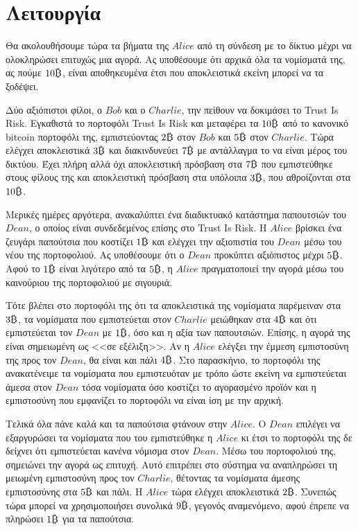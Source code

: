 \section{Λειτουργία}
  Θα ακολουθήσουμε τώρα τα βήματα της $Alice$ από τη σύνδεση με το δίκτυο μέχρι να ολοκληρώσει επιτυχώς μια αγορά. Ας
  υποθέσουμε ότι αρχικά όλα τα νομίσματά της, ας πούμε $10\bitcoin$, είναι αποθηκευμένα έτσι που αποκλειστικά εκείνη μπορεί να
  τα ξοδέψει.

  Δύο αξιόπιστοι φίλοι, ο $Bob$ και ο $Charlie$, την πείθουν να δοκιμάσει το \textlatin{Trust Is Risk}. Εγκαθιστά το πορτοφόλι
  \textlatin{Trust Is Risk} και μεταφέρει τα $10\bitcoin$ από το κανονικό \textlatin{bitcoin} πορτοφόλι της, εμπιστεύοντας
  $2\bitcoin$ στον $Bob$ και $5\bitcoin$ στον $Charlie$. Τώρα ελέγχει αποκλειστικά $3\bitcoin$ και διακινδυνεύει $7\bitcoin$
  με αντάλλαγμα το να είναι μέρος του δικτύου. Έχει πλήρη αλλά όχι αποκλειστική πρόσβαση στα $7\bitcoin$ που εμπιστεύθηκε
  στους φίλους της και αποκλειστική πρόσβαση στα υπόλοιπα $3\bitcoin$, που αθροίζονται στα $10\bitcoin$.

  Μερικές ημέρες αργότερα, ανακαλύπτει ένα διαδικτυακό κατάστημα παπουτσιών του $Dean$, ο οποίος είναι συνδεδεμένος επίσης στο
  \textlatin{Trust Is Risk}. Η $Alice$ βρίσκει ένα ζευγάρι παπούτσια που κοστίζει $1\bitcoin$ και ελέγχει την αξιοπιστία του
  $Dean$ μέσω του νέου της πορτοφολιού. Ας υποθέσουμε ότι ο $Dean$ προκύπτει αξιόπιστος μέχρι $5\bitcoin$. Αφού το $1\bitcoin$
  είναι λιγότερο από τα $5\bitcoin$, η $Alice$ πραγματοποιεί την αγορά μέσω του καινούριου της πορτοφολιού με σιγουριά.

  Τότε βλέπει στο πορτοφόλι της ότι τα αποκλειστικά της νομίσματα παρέμειναν στα $3\bitcoin$, τα νομίσματα που εμπιστεύεται
  στον $Charlie$ μειώθηκαν στα $4\bitcoin$ και ότι εμπιστεύεται τον $Dean$ με $1\bitcoin$, όσο και η αξία των παπουτσιών.
  Επίσης, η αγορά της είναι σημειωμένη ως <<σε εξέλιξη>>. Αν η $Alice$ ελέγξει την έμμεση εμπιστοσύνη της προς τον $Dean$, θα
  είναι και πάλι $4\bitcoin$. Στο παρασκήνιο, το πορτοφόλι της ανακατένειμε τα νομίσματα που εμπιστευόταν με τρόπο ώστε εκείνη
  να εμπιστεύεται άμεσα στον $Dean$ τόσα νομίσματα όσο κοστίζει το αγορασμένο προϊόν και η εμπιστοσύνη που εμφανίζει το
  πορτοφόλι να είναι ίση με την αρχική.

  Τελικά όλα πάνε καλά και τα παπούτσια φτάνουν στην $Alice$. Ο $Dean$ επιλέγει να εξαργυρώσει τα νομίσματα που του
  εμπιστεύθηκε η $Alice$ κι έτσι το πορτοφόλι της δε δείχνει ότι εμπιστεύεται κανένα νόμισμα στον $Dean$. Μέσω του πορτοφολιού
  της, σημειώνει την αγορά ως επιτυχή. Αυτό επιτρέπει στο σύστημα να αναπληρώσει τη μειωμένη εμπιστοσύνη προς τον $Charlie$,
  θέτοντας τα νομίσματα άμεσης εμπιστοσύνης στα $5\bitcoin$ και πάλι. Η $Alice$ τώρα ελέγχει αποκλειστικά $2\bitcoin$. Συνεπώς
  τώρα μπορεί να χρησιμοποιήσει συνολικά $9\bitcoin$, γεγονός αναμενόμενο, αφού έπρεπε να πληρώσει $1\bitcoin$ για τα
  παπούτσια.
